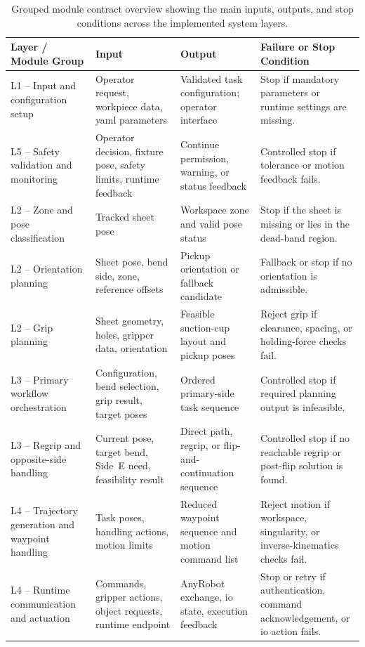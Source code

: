\begin{landscape}
\begin{table}[p]
\centering
\normalsize
\setlength{\tabcolsep}{3pt}
\renewcommand{\arraystretch}{1.08}

\begin{tabularx}{\linewidth}{L{4.2cm} L{5.6cm} L{5.6cm} X}
\hline
\textbf{Layer / Module Group} &
\textbf{Input} &
\textbf{Output} &
\textbf{Failure or Stop Condition} \\
\hline
L1 -- Input and configuration setup &
Operator request, workpiece data, \acs{yaml} parameters &
Validated task configuration; operator interface &
Stop if mandatory parameters or runtime settings are missing. \\
\hline
L5 -- Safety validation and monitoring &
Operator decision, fixture pose, safety limits, runtime feedback &
Continue permission, warning, or status feedback &
Controlled stop if tolerance or motion feedback fails. \\
\hline
L2 -- Zone and pose classification &
Tracked sheet pose &
Workspace zone and valid pose status &
Stop if the sheet is missing or lies in the dead-band region. \\
\hline
L2 -- Orientation planning &
Sheet pose, bend side, zone, reference offsets &
Pickup orientation or fallback candidate &
Fallback or stop if no orientation is admissible. \\
\hline
L2 -- Grip planning &
Sheet geometry, holes, gripper data, orientation &
Feasible suction-cup layout and pickup poses &
Reject grip if clearance, spacing, or holding-force checks fail. \\
\hline
L3 -- Primary workflow orchestration &
Configuration, bend selection, grip result, target poses &
Ordered primary-side task sequence &
Controlled stop if required planning output is infeasible. \\
\hline
L3 -- Regrip and opposite-side handling &
Current pose, target bend, Side~E need, feasibility result &
Direct path, regrip, or flip-and-continuation sequence &
Controlled stop if no reachable regrip or post-flip solution is found. \\
\hline
L4 -- Trajectory generation and waypoint handling &
Task poses, handling actions, motion limits &
Reduced waypoint sequence and motion command list &
Reject motion if workspace, singularity, or inverse-kinematics checks fail. \\
\hline
L4 -- Runtime communication and actuation &
Commands, gripper actions, object requests, runtime endpoint &
AnyRobot exchange, \acs{io} state, execution feedback &
Stop or retry if authentication, command acknowledgement, or \acs{io} action fails. \\
\hline
\end{tabularx}

\caption{Grouped module contract overview showing the main inputs, outputs, and stop conditions across the implemented system layers.}
\label{tab:module-overview}
\end{table}
\end{landscape}
